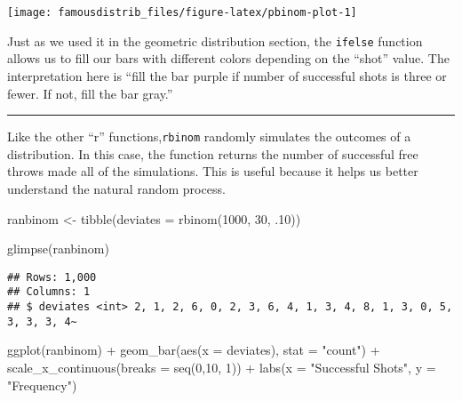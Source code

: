 \documentclass[
]{article}
\newenvironment{Shaded}{\begin{snugshade}}{\end{snugshade}}
\newcommand{\AttributeTok}[1]{\textcolor[rgb]{0.77,0.63,0.00}{#1}}
\newcommand{\DecValTok}[1]{\textcolor[rgb]{0.00,0.00,0.81}{#1}}
\newcommand{\FunctionTok}[1]{\textcolor[rgb]{0.00,0.00,0.00}{#1}}
\newcommand{\NormalTok}[1]{#1}
\newcommand{\OtherTok}[1]{\textcolor[rgb]{0.56,0.35,0.01}{#1}}
\newcommand{\SpecialCharTok}[1]{\textcolor[rgb]{0.00,0.00,0.00}{#1}}
\newcommand{\StringTok}[1]{\textcolor[rgb]{0.31,0.60,0.02}{#1}}
\begin{document}
\begin{center}\texttt{[image: famousdistrib\_files/figure-latex/pbinom-plot-1]} \end{center}

Just as we used it in the geometric distribution section, the \texttt{ifelse} function allows us to fill our bars with different colors depending on the ``shot'' value. The interpretation here is ``fill the bar purple if number of successful shots is three or fewer. If not, fill the bar gray.''

\begin{center}\rule{0.5\linewidth}{0.5pt}\end{center}

Like the other ``r'' functions,\texttt{rbinom} randomly simulates the outcomes of a distribution. In this case, the function returns the number of successful free throws made all of the simulations. This is useful because it helps us better understand the natural random process.

\begin{Shaded}
\begin{Highlighting}[]
\NormalTok{ranbinom }\OtherTok{\textless{}{-}} \FunctionTok{tibble}\NormalTok{(}\AttributeTok{deviates =} \FunctionTok{rbinom}\NormalTok{(}\DecValTok{1000}\NormalTok{, }\DecValTok{30}\NormalTok{, .}\DecValTok{10}\NormalTok{))}

\FunctionTok{glimpse}\NormalTok{(ranbinom)}
\end{Highlighting}
\end{Shaded}

\begin{verbatim}
## Rows: 1,000
## Columns: 1
## $ deviates <int> 2, 1, 2, 6, 0, 2, 3, 6, 4, 1, 3, 4, 8, 1, 3, 0, 5, 3, 3, 3, 4~
\end{verbatim}

\begin{Shaded}
\begin{Highlighting}[]
\FunctionTok{ggplot}\NormalTok{(ranbinom) }\SpecialCharTok{+}
  \FunctionTok{geom\_bar}\NormalTok{(}\FunctionTok{aes}\NormalTok{(}\AttributeTok{x =}\NormalTok{ deviates), }\AttributeTok{stat =} \StringTok{"count"}\NormalTok{) }\SpecialCharTok{+}
  \FunctionTok{scale\_x\_continuous}\NormalTok{(}\AttributeTok{breaks =} \FunctionTok{seq}\NormalTok{(}\DecValTok{0}\NormalTok{,}\DecValTok{10}\NormalTok{, }\DecValTok{1}\NormalTok{)) }\SpecialCharTok{+}
  \FunctionTok{labs}\NormalTok{(}\AttributeTok{x =} \StringTok{"Successful Shots"}\NormalTok{, }\AttributeTok{y =} \StringTok{"Frequency"}\NormalTok{)}
\end{Highlighting}
\end{Shaded}
\end{document}

